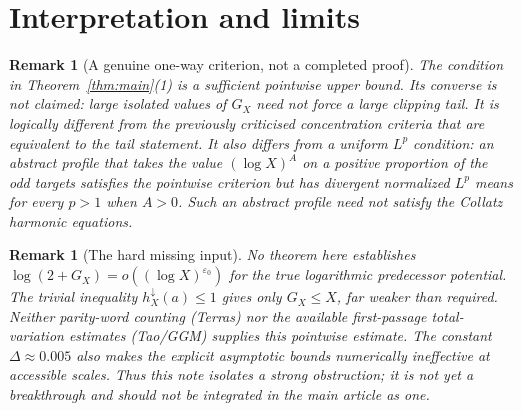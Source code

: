 \documentclass[11pt,a4paper]{article}
\newtheorem{remark}[theorem]{Remark}
\begin{document}
\section{Interpretation and limits}
\begin{remark}[A genuine one-way criterion, not a completed proof]
The condition in Theorem~\ref{thm:main}(1) is a \emph{sufficient}
pointwise upper bound.  Its converse is not claimed: large isolated
values of $G_X$ need not force a large clipping tail.  It is
logically different from the previously criticised concentration
criteria that are equivalent to the tail statement.  It also differs
from a uniform $L^p$ condition: an abstract profile that takes the
value $(\log X)^A$ on a positive proportion of the odd targets
satisfies the pointwise criterion but has divergent normalized $L^p$
means for every $p>1$ when $A>0$. Such an abstract profile need
not satisfy the Collatz harmonic equations.
\end{remark}
\begin{remark}[The hard missing input]
No theorem here establishes
$\log(2+G_X)=o((\log X)^{\varepsilon_0})$ for the true
logarithmic predecessor potential. The trivial inequality
$h_X^\downarrow(a)\le1$ gives only $G_X\le X$, far weaker
than required. Neither parity-word counting (Terras) nor the
available first-passage total-variation estimates (Tao/GGM)
supplies this pointwise estimate. The constant
$\Delta\approx0.005$ also makes the explicit asymptotic bounds
numerically ineffective at accessible scales. Thus this note
isolates a strong obstruction; it is \emph{not} yet a breakthrough
and should not be integrated in the main article as one.
\end{remark}
\end{document}
